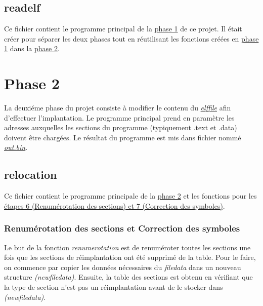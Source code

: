 \documentclass[a4paper]{article} %
\begin{document}

\subsection{readelf}
\label{sec:readelf}
Ce fichier contient le programme principal de la \hyperref[sec:phase1]{phase 1} de ce projet. 
Il était créer pour séparer les deux phases tout en réutilisant les fonctions créées en 
\hyperref[sec:phase1]{phase 1} dans la \hyperref[sec:phase2]{phase 2}.


\section{Phase 2}
\label{sec:phase2}
La deuxiéme phase du projet consiste à modifier le contenu du \hyperref[sec:elffile]{\textit{elffile}}
afin d'effectuer l'implantation. Le programme principal prend en paramètre 
les adresses auxquelles les sections du programme (typiquement .text et .data) 
doivent être chargées. Le résultat du programme est mis dans fichier nommé 
\hyperref[sec:bin]{\textit{out.bin}}. 


\subsection{relocation}
\noindent Ce fichier contient le programme principale de la \hyperref[sec:phase2]{phase 2} et 
les fonctions pour les \hyperref[sec:67]{étapes 6 (Renumérotation des sections) et 7 (Correction des 
symboles)}.  


\subsubsection*{Renumérotation des sections et Correction des symboles}
\label{sec:67}
Le but de la fonction \textit{renumerotation} est de renuméroter toutes les sections 
une fois que les sections de réimplantation ont été supprimé de la table. 
Pour le faire, on commence par copier les données nécessaires du \textit{filedata} 
dans un nouveau structure \textit{(newfiledata)}. Ensuite, la table des sections 
est obtenu en vérifiant que la type de section n'est pas un réimplantation avant de 
le stocker dans \textit{(newfiledata)}.
\end{document}
